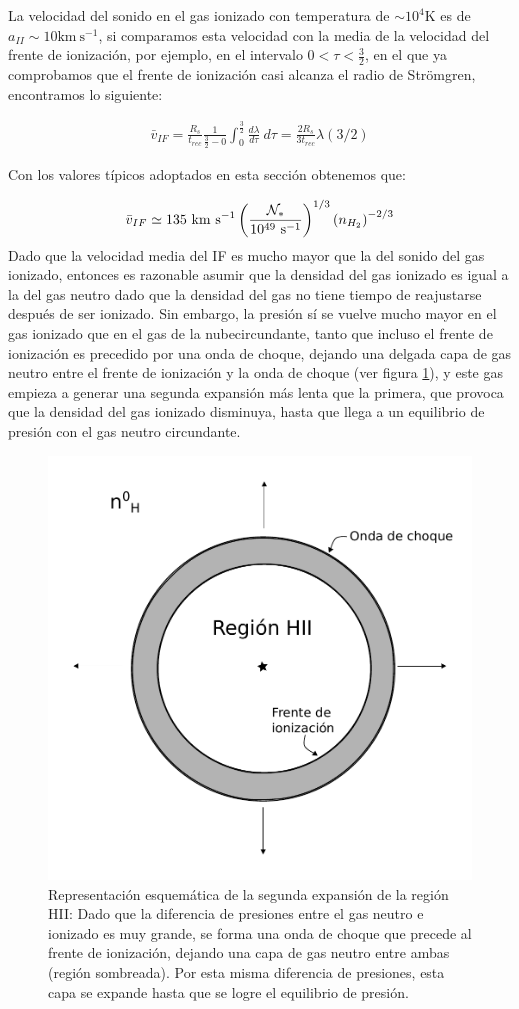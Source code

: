 La velocidad del sonido en el gas ionizado con temperatura de $\sim 10^4\mathrm{K}$ es de $a_{II}\sim 10\mathrm{km~s^{-1}}$, si comparamos esta velocidad con la media de la velocidad del frente de ionización, por ejemplo, en el intervalo $0< \tau < \frac{3}{2}$, en el que ya comprobamos que el frente de ionización casi alcanza el radio de Strömgren, encontramos lo siguiente:

\begin{align}
  \bar{v}_{IF} = \frac{R_s}{t_{rec}}\frac{1}{\frac{3}{2}- 0}\int^{\frac{3}{2}}_0 \frac{d\lambda}{d\tau}~d\tau = \frac{2R_s}{3t_{rec}}\lambda\left(3/2\right)
\end{align}

Con los valores típicos adoptados en esta sección obtenemos que:

\begin{align}
  \bar{v}_{IF}\simeq 135\mathrm{~km~s^{-1}}\left(\frac{\mathcal{N}_*}{10^{49}\mathrm{~s^{-1}}}\right)^{1/3}\left(n_{H_2}\right)^{-2/3}
\end{align}
Dado que la velocidad media del IF es mucho mayor que la del sonido del gas ionizado, entonces es razonable asumir que la densidad del gas ionizado es igual a la del gas neutro dado que la densidad del gas no tiene tiempo de reajustarse después de ser ionizado. Sin embargo, la presión sí se vuelve mucho mayor en el gas ionizado que en el gas de la nubecircundante, tanto que incluso el frente de ionización es precedido por una onda de choque, dejando una delgada capa de gas neutro entre el frente de ionización y la onda de choque (ver figura \ref{fig:second-expansion}), y este gas empieza a generar una segunda expansión más lenta que la primera, que provoca que la densidad del gas ionizado disminuya, hasta que llega a un equilibrio de presión con el gas neutro circundante.

\begin{figure}
  \includegraphics[width=0.6\linewidth]{./Figures/second-expansion}
  \caption{Representación esquemática de la segunda expansión de la región HII: Dado que la diferencia de presiones entre el gas neutro e ionizado es muy grande, se forma una onda de choque que precede al frente de ionización, dejando una capa de gas neutro entre ambas (región sombreada). Por esta misma diferencia de presiones, esta capa se expande hasta que se logre el equilibrio de presión.}
  \label{fig:second-expansion}
\end{figure}


